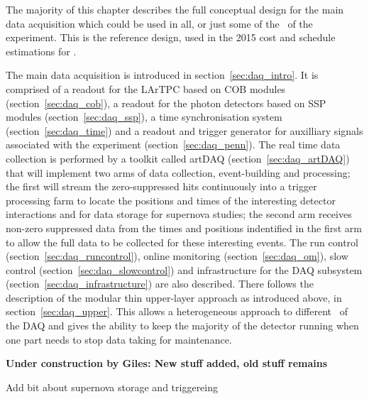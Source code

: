 The majority of this chapter describes the full conceptual design for
the main data acquisition which could be used in all, or just some of
the \COMPARTMENTS\ of the experiment.  This is the reference design,
used in the 2015 cost and schedule estimations for \LBNE.  


The main data acquisition is introduced in
section~\ref{sec:daq_intro}.  It is comprised of a readout for the
LArTPC based on COB modules (section~\ref{sec:daq_cob}), a readout for
the photon detectors based on SSP modules (section~\ref{sec:daq_ssp}),
a time synchronisation system (section~\ref{sec:daq_time}) and a
readout and trigger generator for auxilliary signals associated with
the experiment (section~\ref{sec:daq_penn}).  The real time data
collection is performed by a toolkit called artDAQ
(section~\ref{sec:daq_artDAQ}) that will implement two arms of data
collection, event-building and processing; the first will stream the
zero-suppressed hits continuously into a trigger processing farm to
locate the positions and times of the interesting detector
interactions and for data storage for supernova studies; the second
arm receives non-zero suppressed data from the times and positions
indentified in the first arm to allow the full data to be collected
for these interesting events.  The run control
(section~\ref{sec:daq_runcontrol}), online monitoring
(section~\ref{sec:daq_om}), slow control
(section~\ref{sec:daq_slowcontrol}) and infrastructure for the DAQ
subsystem (section~\ref{sec:daq_infrastructure}) are also described.
There follows the description of the modular thin upper-layer approach
as introduced above, in section~\ref{sec:daq_upper}.  This allows a
heterogeneous approach to different \COMPARTMENTS\ of the DAQ and
gives the ability to keep the majority of the detector running when
one part needs to stop data taking for maintenance.

\begin{editornote} 
\begin{center}
{\bf Under construction by Giles: New stuff added, old stuff remains}
\end{center}
Add bit about supernova storage and triggereing
\end{editornote}

